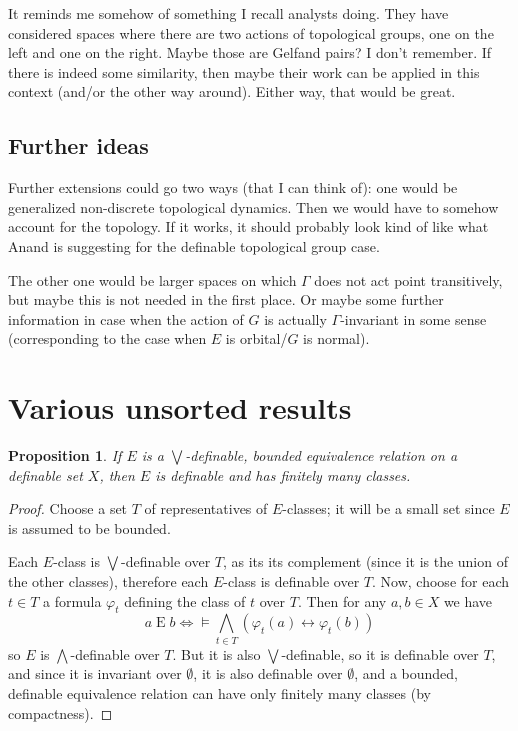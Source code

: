 \documentclass[final,a4paper,12pt]{amsart}
\newcommand{\liff}{\mathrel{\leftrightarrow}}
\newcommand{\bigland}{\bigwedge}
\newcommand{\biglor}{\bigvee}
\newtheorem{prop}[thm]{Proposition}
\theoremstyle{remark}
\theoremstyle{definition}
\let\Gamma\varGamma
\begin{document}
	It reminds me somehow of something I recall analysts doing. They have considered spaces where there are two actions of topological groups, one on the left and one on the right. Maybe those are Gelfand pairs? I don't remember. If there is indeed some similarity, then maybe their work can be applied in this context (and/or the other way around). Either way, that would be great.
	
	\subsection{Further ideas}
	Further extensions could go two ways (that I can think of): one would be generalized non-discrete topological dynamics. Then we would have to somehow account for the topology. If it works, it should probably look kind of like what Anand is suggesting for the definable topological group case.
	
	The other one would be larger spaces on which $\Gamma$ does not act point transitively, but maybe this is not needed in the first place. Or maybe some further information in case when the action of $G$ is actually $\Gamma$-invariant in some sense (corresponding to the case when $E$ is orbital/$G$ is normal).
	
	
	\section{Various unsorted results}
	\begin{prop}
		If $E$ is a $\biglor$-definable, bounded equivalence relation on a definable set $X$, then $E$ is definable and has finitely many classes.
	\end{prop}
	\begin{proof}
		Choose a set $T$ of representatives of $E$-classes; it will be a small set since $E$ is assumed to be bounded.
		
		Each $E$-class is $\biglor$-definable over $T$, as its its complement (since it is the union of the other classes), therefore each $E$-class is definable over $T$. Now, choose for each $t\in T$ a formula $\varphi_t$ defining the class of $t$ over $T$. Then for any $a,b\in X$ we have
		\[
		a\mathrel{E}b\iff \models \bigland_{t\in T} (\varphi_t(a)\liff \varphi_t(b))
		\]
		so $E$ is $\bigland$-definable over $T$. But it is also $\biglor$-definable, so it is definable over $T$, and since it is invariant over $\emptyset$, it is also definable over $\emptyset$, and a bounded, definable equivalence relation can have only finitely many classes (by compactness).
	\end{proof}
	
\end{document}
